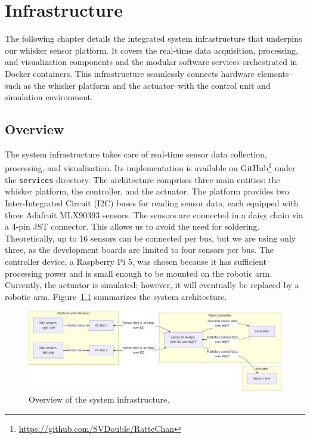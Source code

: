 

\chapter{Infrastructure}

The following chapter details the integrated system infrastructure that underpins our whisker sensor platform.
It covers the real-time data acquisition, processing, and visualization components and the modular software services orchestrated in Docker containers.
This infrastructure seamlessly connects hardware elements--such as the whisker platform and the actuator--with the control unit and simulation environment.


\section{Overview}
The system infrastructure takes care of real-time sensor data collection, processing, and visualization.
Its implementation is available on GitHub\footnote{\url{https://github.com/SVDouble/RatteChan}} under the \texttt{services} directory.
The architecture comprises three main entities: the whisker platform, the controller, and the actuator.
The platform provides two Inter-Integrated Circuit (I2C) buses for reading sensor data, each equipped with three Adafruit MLX90393 sensors.
The sensors are connected in a daisy chain via a 4-pin JST connector.
This allows us to avoid the need for soldering.
Theoretically, up to 16 sensors can be connected per bus, but we are using only three, as the development boards are limited to four sensors per bus.
The controller device, a Raspberry Pi 5, was chosen because it has sufficient processing power and is small enough to be mounted on the robotic arm.
Currently, the actuator is simulated; however, it will eventually be replaced by a robotic arm.
Figure~\ref{fig:infrastructure_overview} summarizes the system architecture.

\begin{figure}[htb]
    \centering
    \includegraphics[width=\textwidth]{figures/diagrams/infrastructure-overview}
    \caption{Overview of the system infrastructure.}
    \label{fig:infrastructure_overview}
\end{figure}


